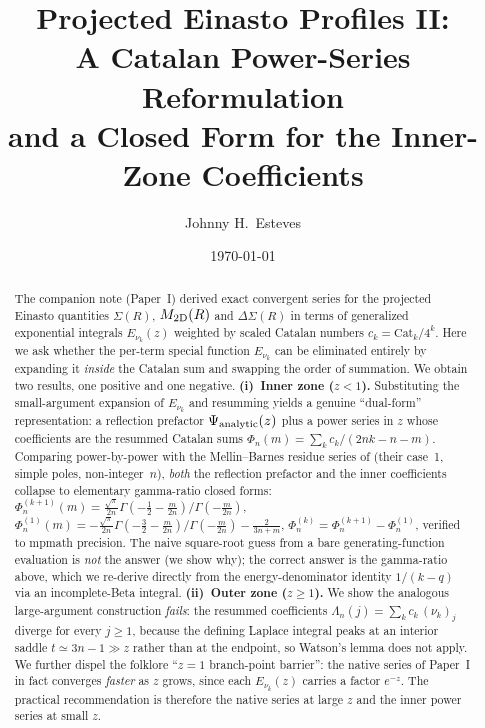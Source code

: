 \documentclass{article}
\title{Projected Einasto Profiles II:\\
A Catalan Power-Series Reformulation\\
and a Closed Form for the Inner-Zone Coefficients}
\author{Johnny H.~Esteves}
\date{\today}
\begin{document}
\maketitle

\begin{abstract}
The companion note (Paper~I) derived exact convergent series for the projected
Einasto quantities $\Sigma(R)$, $M_{\rm 2D}(R)$ and $\Delta\Sigma(R)$ in terms
of generalized exponential integrals $E_{\nu_k}(z)$ weighted by scaled Catalan
numbers $c_k=\mathrm{Cat}_k/4^k$.  Here we ask whether the per-term special
function $E_{\nu_k}$ can be eliminated entirely by expanding it \emph{inside}
the Catalan sum and swapping the order of summation.  We obtain two results,
one positive and one negative.  \textbf{(i)~Inner zone ($z<1$).}  Substituting
the small-argument expansion of $E_{\nu_k}$ and resumming yields a genuine
``dual-form'' representation: a reflection prefactor
$\Psi_{\rm analytic}(z)$ plus a power series in $z$ whose coefficients
are the resummed Catalan sums $\Phi_n(m)=\sum_k c_k/(2nk-n-m)$.
Comparing power-by-power with the Mellin--Barnes residue series of
\citet{RetanaMontenegro2012} (their case~1, simple poles, non-integer~$n$), \emph{both}
the reflection prefactor and the inner coefficients collapse to elementary
gamma-ratio closed forms:
$\Phi^{(k+1)}_n(m)=\tfrac{\sqrt\pi}{2n}\Gamma(-\tfrac12-\tfrac{m}{2n})/\Gamma(-\tfrac{m}{2n})$,
$\Phi^{(1)}_n(m)=-\tfrac{\sqrt\pi}{2n}\Gamma(-\tfrac32-\tfrac{m}{2n})/\Gamma(-\tfrac{m}{2n})-\tfrac{2}{3n+m}$,
$\Phi^{(k)}_n=\Phi^{(k+1)}_n-\Phi^{(1)}_n$, verified to mpmath precision.
The naive square-root guess from a bare generating-function evaluation is
\emph{not} the answer (we show why); the correct answer is the gamma-ratio
above, which we re-derive directly from the energy-denominator identity
$1/(k-q)$ via an incomplete-Beta integral.  \textbf{(ii)~Outer zone ($z\ge1$).}  We show the analogous
large-argument construction \emph{fails}: the resummed coefficients
$\Lambda_n(j)=\sum_k c_k\,(\nu_k)_j$ diverge for every $j\ge1$, because the
defining Laplace integral peaks at an interior saddle $t\simeq3n-1\gg z$ rather
than at the endpoint, so Watson's lemma does not apply.  We further dispel the
folklore ``$z=1$ branch-point barrier'': the native series of Paper~I in fact
converges \emph{faster} as $z$ grows, since each $E_{\nu_k}(z)$ carries a factor
$e^{-z}$.  The practical recommendation is therefore the native series at large
$z$ and the inner power series at small $z$.
\end{abstract}
\end{document}
